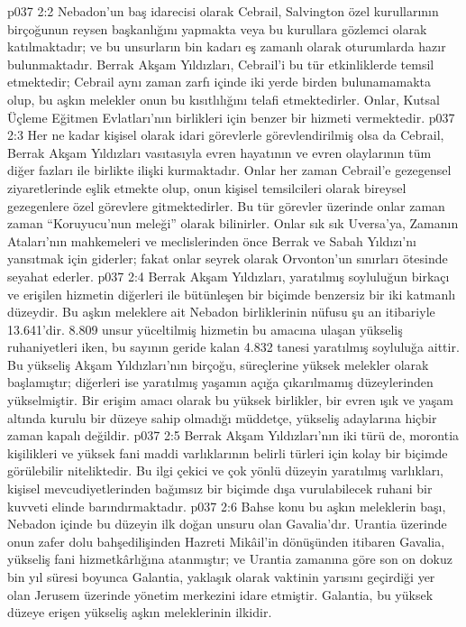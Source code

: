 \vs p037 2:2 Nebadon’un baş idarecisi olarak Cebrail, Salvington özel kurullarının birçoğunun reysen başkanlığını yapmakta veya bu kurullara gözlemci olarak katılmaktadır; ve bu unsurların bin kadarı eş zamanlı olarak oturumlarda hazır bulunmaktadır. Berrak Akşam Yıldızları, Cebrail’i bu tür etkinliklerde temsil etmektedir; Cebrail aynı zaman zarfı içinde iki yerde birden bulunamamakta olup, bu aşkın melekler onun bu kısıtlılığını telafi etmektedirler. Onlar, Kutsal Üçleme Eğitmen Evlatları’nın birlikleri için benzer bir hizmeti vermektedir.
\vs p037 2:3 Her ne kadar kişisel olarak idari görevlerle görevlendirilmiş olsa da Cebrail, Berrak Akşam Yıldızları vasıtasıyla evren hayatının ve evren olaylarının tüm diğer fazları ile birlikte ilişki kurmaktadır. Onlar her zaman Cebrail’e gezegensel ziyaretlerinde eşlik etmekte olup, onun kişisel temsilcileri olarak bireysel gezegenlere özel görevlere gitmektedirler. Bu tür görevler üzerinde onlar zaman zaman “Koruyucu’nun meleği” olarak bilinirler. Onlar sık sık Uversa’ya, Zamanın Ataları’nın mahkemeleri ve meclislerinden önce Berrak ve Sabah Yıldızı’nı yansıtmak için giderler; fakat onlar seyrek olarak Orvonton’un sınırları ötesinde seyahat ederler.
\vs p037 2:4 Berrak Akşam Yıldızları, yaratılmış soyluluğun birkaçı ve erişilen hizmetin diğerleri ile bütünleşen bir biçimde benzersiz bir iki katmanlı düzeydir. Bu aşkın meleklere ait Nebadon birliklerinin nüfusu şu an itibariyle 13.641’dir. 8.809 unsur yüceltilmiş hizmetin bu amacına ulaşan yükseliş ruhaniyetleri iken, bu sayının geride kalan 4.832 tanesi yaratılmış soyluluğa aittir. Bu yükseliş Akşam Yıldızları’nın birçoğu, süreçlerine yüksek melekler olarak başlamıştır; diğerleri ise yaratılmış yaşamın açığa çıkarılmamış düzeylerinden yükselmiştir. Bir erişim amacı olarak bu yüksek birlikler, bir evren ışık ve yaşam altında kurulu bir düzeye sahip olmadığı müddetçe, yükseliş adaylarına hiçbir zaman kapalı değildir.
\vs p037 2:5 Berrak Akşam Yıldızları’nın iki türü de, morontia kişilikleri ve yüksek fani maddi varlıklarının belirli türleri için kolay bir biçimde görülebilir niteliktedir. Bu ilgi çekici ve çok yönlü düzeyin yaratılmış varlıkları, kişisel mevcudiyetlerinden bağımsız bir biçimde dışa vurulabilecek ruhani bir kuvveti elinde barındırmaktadır.
\vs p037 2:6 Bahse konu bu aşkın meleklerin başı, Nebadon içinde bu düzeyin ilk doğan unsuru olan Gavalia’dır. Urantia üzerinde onun zafer dolu bahşedilişinden Hazreti Mikâil’in dönüşünden itibaren Gavalia, yükseliş fani hizmetkârlığına atanmıştır; ve Urantia zamanına göre son on dokuz bin yıl süresi boyunca Galantia, yaklaşık olarak vaktinin yarısını geçirdiği yer olan Jerusem üzerinde yönetim merkezini idare etmiştir. Galantia, bu yüksek düzeye erişen yükseliş aşkın meleklerinin ilkidir.
